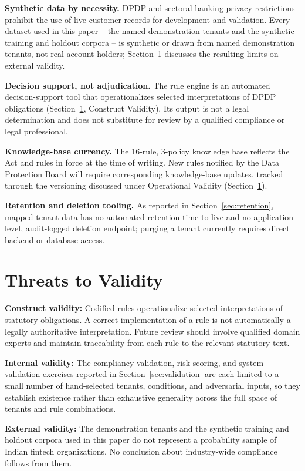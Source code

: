 \documentclass[11pt,a4paper]{article}
\begin{document}
\textbf{Synthetic data by necessity.} DPDP and sectoral banking-privacy restrictions prohibit the use of live customer records for development and validation. Every dataset used in this paper -- the named demonstration tenants and the synthetic training and holdout corpora -- is synthetic or drawn from named demonstration tenants, not real account holders; Section~\ref{sec:threats} discusses the resulting limits on external validity.

\textbf{Decision support, not adjudication.} The rule engine is an automated decision-support tool that operationalizes selected interpretations of DPDP obligations (Section~\ref{sec:threats}, Construct Validity). Its output is not a legal determination and does not substitute for review by a qualified compliance or legal professional.

\textbf{Knowledge-base currency.} The 16-rule, 3-policy knowledge base reflects the Act and rules in force at the time of writing. New rules notified by the Data Protection Board will require corresponding knowledge-base updates, tracked through the versioning discussed under Operational Validity (Section~\ref{sec:threats}).

\textbf{Retention and deletion tooling.} As reported in Section~\ref{sec:retention}, mapped tenant data has no automated retention time-to-live and no application-level, audit-logged deletion endpoint; purging a tenant currently requires direct backend or database access.

\section{Threats to Validity}
\label{sec:threats}
\textbf{Construct validity:} Codified rules operationalize selected interpretations of statutory obligations. A correct implementation of a rule is not automatically a legally authoritative interpretation. Future review should involve qualified domain experts and maintain traceability from each rule to the relevant statutory text.

\textbf{Internal validity:} The compliancy-validation, risk-scoring, and system-validation exercises reported in Section~\ref{sec:validation} are each limited to a small number of hand-selected tenants, conditions, and adversarial inputs, so they establish existence rather than exhaustive generality across the full space of tenants and rule combinations.

\textbf{External validity:} The demonstration tenants and the synthetic training and holdout corpora used in this paper do not represent a probability sample of Indian fintech organizations. No conclusion about industry-wide compliance follows from them.
\end{document}
